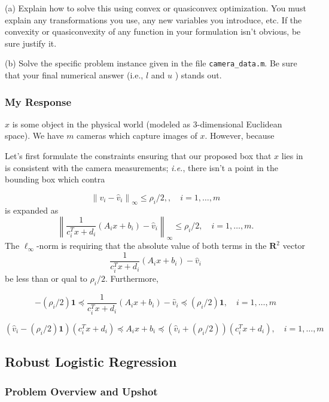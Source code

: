 \documentclass[12pt,reqno]{article}
\theoremstyle{definition}
\numberwithin{equation}{section}
\begin{document}
\vspace{0.1cm}
\noindent (a) Explain how to solve this using convex or quasiconvex optimization. You must explain any transformations you use, any new variables you introduce, etc.
If the convexity or quasiconvexity of any function in your formulation isn't obvious, be sure justify it.

\vspace{0.1cm}
\noindent (b) Solve the specific problem instance given in the file \lstinline|camera_data.m|. Be sure that your final numerical answer (i.e., $l$ and $u$ ) stands out.

\subsubsection*{My Response}

$x$ is some object in the physical world (modeled as 3-dimensional Euclidean space). We have $m$ cameras which capture images
of $x$. However, because

Let's first formulate the constraints ensuring that our proposed box that $x$ lies in is consistent with the camera measurements;
\textit{i.e.}, there isn't a point in the bounding box which contra

\[\left\lVert v_i - \hat{v}_i \right\rVert_{\infty} \le \rho_i / 2, , \quad i = 1, \ldots, m\]
is expanded as 
\[\left\lVert \frac{1}{c_i^T x+d_i}\left(A_i x+b_i\right) - \hat{v}_i \right\rVert_{\infty} \le \rho_i/2, \quad i = 1, \ldots, m.\]
The $\ell_{\infty}$-norm is requiring that the absolute value of both terms in the $\mathbf{R}^2$ vector
\[\frac{1}{c_i^T x+d_i}\left(A_i x+b_i\right) - \hat{v}_i\]
be less than or qual to $\rho_i/2$. Furthermore,

\[-(\rho_i/2) \bm{1} \preceq \frac{1}{c_i^T x+d_i}\left(A_i x+b_i\right) - \hat{v}_i \preceq (\rho_i/2) \bm{1}, \quad i = 1, \ldots, m\]

\[(\hat{v}_i - (\rho_i/2) \bm{1})(c_i^T x + d_i) \preceq A_i x + b_i \preceq (\hat{v}_i + (\rho_i/2))(c_i^Tx + d_i), \quad i = 1, \ldots, m\]

\subsection{Robust Logistic Regression}

\subsubsection*{Problem Overview and Upshot}
\end{document}
